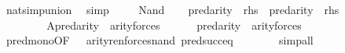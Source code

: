 \begin{isabellebody}
\ nat{\isacharunderscore}{\kern0pt}simp{\isacharunderscore}{\kern0pt}union\ \isamarkupfalse%
\ simp\isanewline
\ \ \isamarkupfalse%
\ {\isacartoucheopen}{\isasymphi}{\isasymin}{\isacharunderscore}{\kern0pt}{\isacartoucheclose}\ Nand\isanewline
\ \ \isamarkupfalse%
\ {\isachardoublequoteopen}pred{\isacharparenleft}{\kern0pt}arity{\isacharparenleft}{\kern0pt}{\isacharquery}{\kern0pt}{\isasymphi}{\isacharprime}{\kern0pt}{\isacharparenright}{\kern0pt}{\isacharparenright}{\kern0pt}\ {\isasymle}\ {\isacharquery}{\kern0pt}rhs{\isachardoublequoteclose}\ \ {\isachardoublequoteopen}pred{\isacharparenleft}{\kern0pt}arity{\isacharparenleft}{\kern0pt}{\isacharquery}{\kern0pt}{\isasympsi}{\isacharprime}{\kern0pt}{\isacharparenright}{\kern0pt}{\isacharparenright}{\kern0pt}\ {\isasymle}\ {\isacharquery}{\kern0pt}rhs{\isachardoublequoteclose}\isanewline
\ \ \isamarkupfalse%
\ {\isacharminus}{\kern0pt}\isanewline
\ \ \ \ \isamarkupfalse%
\ {\isacartoucheopen}{\isasymphi}{\isasymin}{\isacharunderscore}{\kern0pt}{\isacartoucheclose}\ {\isacartoucheopen}{\isasympsi}{\isasymin}{\isacharunderscore}{\kern0pt}{\isacartoucheclose}\isanewline
\ \ \ \ \isamarkupfalse%
\ A{\isacharcolon}{\kern0pt}{\isachardoublequoteopen}pred{\isacharparenleft}{\kern0pt}arity{\isacharparenleft}{\kern0pt}{\isacharquery}{\kern0pt}{\isasymphi}{\isacharprime}{\kern0pt}{\isacharparenright}{\kern0pt}{\isacharparenright}{\kern0pt}\ {\isasymle}\ arity{\isacharparenleft}{\kern0pt}forces{\isacharprime}{\kern0pt}{\isacharparenleft}{\kern0pt}{\isasymphi}{\isacharparenright}{\kern0pt}{\isacharparenright}{\kern0pt}{\isachardoublequoteclose}\isanewline
\ \ \ \ \ \ {\isachardoublequoteopen}pred{\isacharparenleft}{\kern0pt}arity{\isacharparenleft}{\kern0pt}{\isacharquery}{\kern0pt}{\isasympsi}{\isacharprime}{\kern0pt}{\isacharparenright}{\kern0pt}{\isacharparenright}{\kern0pt}\ {\isasymle}\ arity{\isacharparenleft}{\kern0pt}forces{\isacharprime}{\kern0pt}{\isacharparenleft}{\kern0pt}{\isasympsi}{\isacharparenright}{\kern0pt}{\isacharparenright}{\kern0pt}{\isachardoublequoteclose}\isanewline
\ \ \ \ \ \ \isamarkupfalse%
\ pred{\isacharunderscore}{\kern0pt}mono{\isacharbrackleft}{\kern0pt}OF\ {\isacharunderscore}{\kern0pt}\ \ arity{\isacharunderscore}{\kern0pt}ren{\isacharunderscore}{\kern0pt}forces{\isacharunderscore}{\kern0pt}nand{\isacharbrackright}{\kern0pt}\ pred{\isacharunderscore}{\kern0pt}succ{\isacharunderscore}{\kern0pt}eq\isanewline
\ \ \ \ \ \ \isamarkupfalse%
\ simp{\isacharunderscore}{\kern0pt}all\isanewline

\end{isabellebody}
